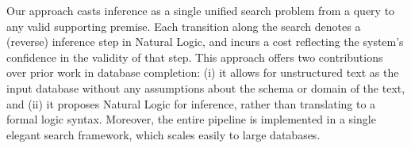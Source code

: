 
Our approach casts inference as a single unified search problem from 
  a query to any valid supporting premise.
Each transition along the search denotes a (reverse) inference step 
  in Natural Logic, and incurs a cost reflecting the system's confidence
  in the validity of that step.
This approach offers two contributions over prior work in
  database completion:
  (i) it allows for unstructured text as the input database without
    any assumptions about the schema or domain of the text,
  and (ii) it proposes Natural Logic for inference, rather than
    translating to a formal logic syntax.
Moreover, the entire pipeline is implemented 
  in a single elegant search framework, which scales easily to large
  databases.

%
%

